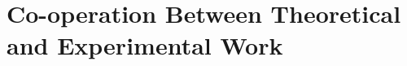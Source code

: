 \section{Co-operation Between Theoretical and Experimental Work}
\label{sec:cooperation}

\placeholder
